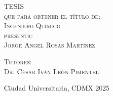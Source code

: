 \begin{titlepage}
\begin{minipage}[c][0.81\textheight][t]{0.75\textwidth}
\begin{center}
            \textsc{\LARGE T\hspace{1.5cm}E\hspace{1.5cm}S\hspace{1.5cm}I\hspace{1.5cm}S}\\[0.5cm]
            \textsc{\large que para obtener el t\'itulo de:}\\[0.5cm]
            \textsc{\large Ingeniero Químico}\\[0.5cm]
            \textsc{\large presenta:}\\[0.5cm]
            \textsc{\large {Jorge Angel Rosas Martínez}}\\[2cm]          

            \vspace{0.5cm}

            {\large\scshape Tutores:\\[0.3cm] {Dr. César Iván León Pimentel}}\\[.2in]

            \vspace{0.5cm}

            \large{Ciudad Universitaria, CDMX}{ }{2025}
        \end{center}
    \end{minipage}
\end{titlepage}
